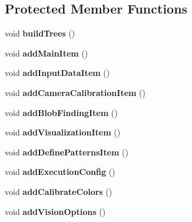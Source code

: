 \subsection*{Protected Member Functions}
\begin{DoxyCompactItemize}
\item 
\hypertarget{classMainWindow_a904aeccdff7a61af31954793944ef364}{void {\bfseries build\-Trees} ()}\label{classMainWindow_a904aeccdff7a61af31954793944ef364}

\item 
\hypertarget{classMainWindow_a7f3e055a4f80071b7265cc32d10b1a29}{void {\bfseries add\-Main\-Item} ()}\label{classMainWindow_a7f3e055a4f80071b7265cc32d10b1a29}

\item 
\hypertarget{classMainWindow_aa2cc5fc73f649129465c371368185189}{void {\bfseries add\-Input\-Data\-Item} ()}\label{classMainWindow_aa2cc5fc73f649129465c371368185189}

\item 
\hypertarget{classMainWindow_ae887769c9a6614f6827afdb74ab9cd12}{void {\bfseries add\-Camera\-Calibration\-Item} ()}\label{classMainWindow_ae887769c9a6614f6827afdb74ab9cd12}

\item 
\hypertarget{classMainWindow_a659cf521c8e7053eaba4971293050883}{void {\bfseries add\-Blob\-Finding\-Item} ()}\label{classMainWindow_a659cf521c8e7053eaba4971293050883}

\item 
\hypertarget{classMainWindow_aa30ad88d5b5acbf1cc9f70840d416e24}{void {\bfseries add\-Visualization\-Item} ()}\label{classMainWindow_aa30ad88d5b5acbf1cc9f70840d416e24}

\item 
\hypertarget{classMainWindow_a9f08218f96f231b1615ce24d933b15ce}{void {\bfseries add\-Define\-Patterns\-Item} ()}\label{classMainWindow_a9f08218f96f231b1615ce24d933b15ce}

\item 
\hypertarget{classMainWindow_a4d645b048c765c34481cb4e7749af6cf}{void {\bfseries add\-Execution\-Config} ()}\label{classMainWindow_a4d645b048c765c34481cb4e7749af6cf}

\item 
\hypertarget{classMainWindow_a5fa2d31a87dcc532276b17ab49712add}{void {\bfseries add\-Calibrate\-Colors} ()}\label{classMainWindow_a5fa2d31a87dcc532276b17ab49712add}

\item 
\hypertarget{classMainWindow_a84f4504e9262385ede0b0e89832181f9}{void {\bfseries add\-Vision\-Options} ()}\label{classMainWindow_a84f4504e9262385ede0b0e89832181f9}


\end{DoxyCompactItemize}
